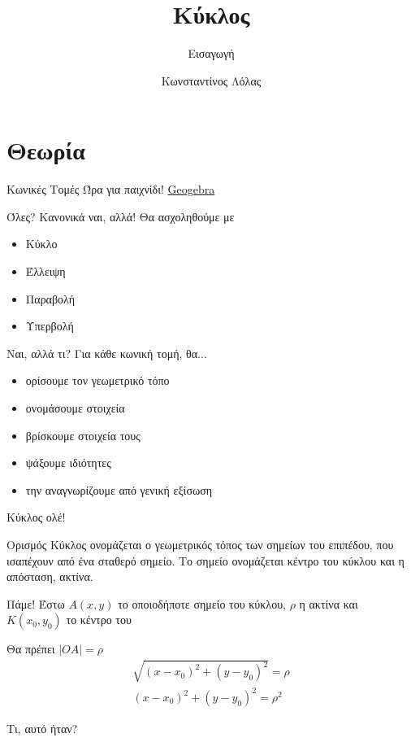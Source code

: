 \documentclass[greek]{beamer}
\title{Κύκλος}
\subtitle{Εισαγωγή}
\author[Λόλας]{Κωνσταντίνος Λόλας}
\date{}
\begin{document}
\begin{frame}
  \titlepage
\end{frame}

\section{Θεωρία}
\begin{frame}{Κωνικές Τομές}
  Ώρα για παιχνίδι!
  \href{https://www.geogebra.org/m/pCg8NFVT}{Geogebra}
\end{frame}

\begin{frame}{Όλες? Κανονικά ναι, αλλά!}
  Θα ασχοληθούμε με
  \begin{itemize}
    \item Κύκλο
    \item Έλλειψη
    \item Παραβολή
    \item Υπερβολή
  \end{itemize}
\end{frame}

\begin{frame}{Ναι, αλλά τι?}
  Για κάθε κωνική τομή, θα...
  \begin{itemize}
    \item<1-> ορίσουμε τον γεωμετρικό τόπο
    \item<2-> ονομάσουμε στοιχεία
    \item<3-> βρίσκουμε στοιχεία τους
    \item<4-> ψάξουμε ιδιότητες
    \item<5-> την αναγνωρίζουμε από γενική εξίσωση
  \end{itemize}
\end{frame}

\begin{frame}{Κύκλος ολέ!}
  \begin{block}{Ορισμός}
    Κύκλος ονομάζεται ο γεωμετρικός τόπος των σημείων του επιπέδου, που ισαπέχουν από ένα σταθερό σημείο. Το σημείο ονομάζεται κέντρο του κύκλου και η απόσταση, ακτίνα.
  \end{block}
\end{frame}

\begin{frame}{Πάμε!}
   Έστω $A(x,y)$ το οποιοδήποτε σημείο του κύκλου, $ρ$ η ακτίνα και $Κ(x_0,y_0)$ το κέντρο του

   Θα πρέπει $|ΟΑ|=ρ$
  \begin{align*}
    \sqrt{(x-x_0)^2+(y-y_0)^2}=ρ \\
    (x-x_0)^2+(y-y_0)^2=ρ^2
  \end{align*}

   Τι, αυτό ήταν?

\end{frame}
\end{document}
